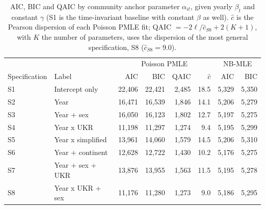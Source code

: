 \begin{table}[H]
\centering
\caption{\label{tbl-aic-specs}AIC, BIC and QAIC by community anchor parameter $\alpha_{it}$, given yearly $\beta_t$ and constant $\gamma$ (S1 is the time-invariant baseline with constant $\beta$ as well). $\hat c$ is the Pearson dispersion of each Poisson PMLE fit; QAIC $= -2\ell/\hat c_{S8} + 2(K+1)$, with $K$ the number of parameters, uses the dispersion of the most general specification, S8 ($\hat c_{S8} = 9.0$).}
\begin{tabular}{llrrrr|rr} \toprule
& & \multicolumn{4}{c|}{Poisson PMLE} & \multicolumn{2}{c}{NB-MLE} \\
Specification & Label & AIC & BIC & QAIC & $\hat c$ & AIC & BIC \\ \midrule
S1 & Intercept only & 22,406 & 22,421 & 2,485 & 18.5 & 5,329 & 5,350 \\
S2 & Year & 16,471 & 16,539 & 1,846 & 14.1 & 5,206 & 5,279 \\
S3 & Year + sex & 16,050 & 16,123 & 1,802 & 12.7 & 5,197 & 5,275 \\
S4 & Year x UKR & 11,198 & 11,297 & 1,274 & 9.4 & 5,195 & 5,299 \\
S5 & Year x simplified & 13,961 & 14,060 & 1,579 & 14.5 & 5,206 & 5,310 \\
S6 & Year + continent & 12,628 & 12,722 & 1,430 & 10.2 & 5,176 & 5,275 \\
S7 & Year + sex + UKR & 13,876 & 13,955 & 1,563 & 11.5 & 5,195 & 5,278 \\
S8 & Year x UKR + sex & 11,176 & 11,280 & 1,273 & 9.0 & 5,186 & 5,295 \\
\bottomrule
\end{tabular}
\end{table}
